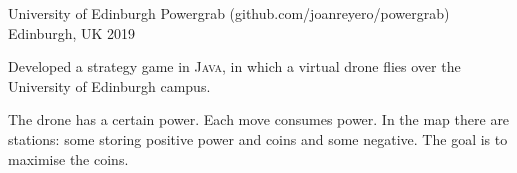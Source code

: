 \begin{cventries}
\cventry
    {University of Edinburgh}
    {Powergrab {\tiny (github.com/joanreyero/powergrab)}}
    {Edinburgh, UK}
    {2019}
    {
     \begin{cvitems} %
        \item {Developed a strategy game in \textsc{Java}, in which a virtual drone flies over the University of Edinburgh campus.}
        \item{The drone has a certain power. Each move consumes power. In the map there are stations: some storing positive power and coins and some negative. The goal is to maximise the coins.}
      \end{cvitems}
    }

\end{cventries}


